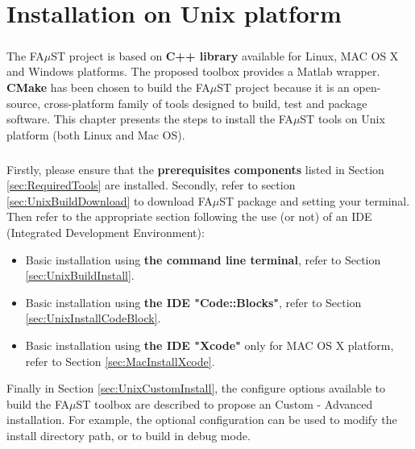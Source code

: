 \chapter{Installation on Unix platform}\label{sec:InstallUnix}

\paragraph{}The FA$\mu$ST project is based on \textbf{C++ library} available for Linux, MAC OS X and Windows platforms. The proposed toolbox provides a Matlab wrapper. \textbf{CMake} has been chosen to build the FA$\mu$ST project because it is an open-source, cross-platform family of tools designed to build, test and package software. This chapter presents the steps to install the FA$\mu$ST tools on Unix platform (both Linux and Mac OS). 

\paragraph{}Firstly, please ensure that the \textbf{prerequisites components} listed in Section \ref{sec:RequiredTools} are installed. Secondly, refer to section 
\ref{sec:UnixBuildDownload} to download FA$\mu$ST package and setting your terminal. Then refer to the appropriate section following the use (or not) of an IDE (Integrated Development Environment): 
\begin{itemize}
\item Basic installation using \textbf{the command line terminal}, refer to Section \ref{sec:UnixBuildInstall}.
\item Basic installation using \textbf{the IDE "Code::Blocks"}, refer to Section \ref{sec:UnixInstallCodeBlock}. 
\item Basic installation using \textbf{the IDE "Xcode"} only for MAC OS X platform, refer to Section \ref{sec:MacInstallXcode}. 
\end{itemize}

Finally in Section \ref{sec:UnixCustomInstall}, the configure options available to build the FA$\mu$ST toolbox are described to propose an Custom - Advanced installation. For example, the optional configuration can be used to modify the install directory path, or to build in debug mode.  

